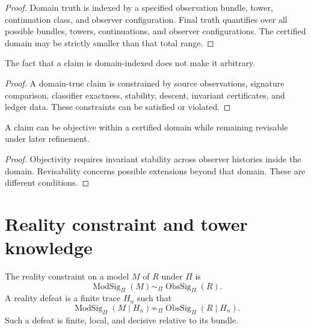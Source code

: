 \begin{proof}
Domain truth is indexed by a specified observation bundle, tower, continuation class, and observer configuration. Final truth quantifies over all possible bundles, towers, continuations, and observer configurations. The certified domain may be strictly smaller than that total range.
\end{proof}

\begin{corollary}
\label{cor:non-final-truth-not-relativism}
The fact that a claim is domain-indexed does not make it arbitrary.
\end{corollary}

\begin{proof}
A domain-true claim is constrained by source observations, signature comparison, classifier exactness, stability, descent, invariant certificates, and ledger data. These constraints can be satisfied or violated.
\end{proof}

\begin{corollary}
\label{cor:objectivity-revisability-compatible}
A claim can be objective within a certified domain while remaining revisable under later refinement.
\end{corollary}

\begin{proof}
Objectivity requires invariant stability across observer histories inside the domain. Revisability concerns possible extensions beyond that domain. These are different conditions.
\end{proof}

\section{Reality constraint and tower knowledge}
\label{sec:reality-constraint-tower-knowledge}

\begin{definition}
\label{def:reality-constraint-defeat}
The reality constraint on a model $M$ of $R$ under $\Pi$ is
$$
\operatorname{ModSig}_{\Pi}(M)
\sim_{\Pi}
\operatorname{ObsSig}_{\Pi}(R).
$$
A reality defeat is a finite trace $H_n$ such that
$$
\operatorname{ModSig}_{\Pi}(M\mid H_n)
\not\sim_{\Pi}
\operatorname{ObsSig}_{\Pi}(R\mid H_n).
$$
Such a defeat is finite, local, and decisive relative to its bundle.
\end{definition}

